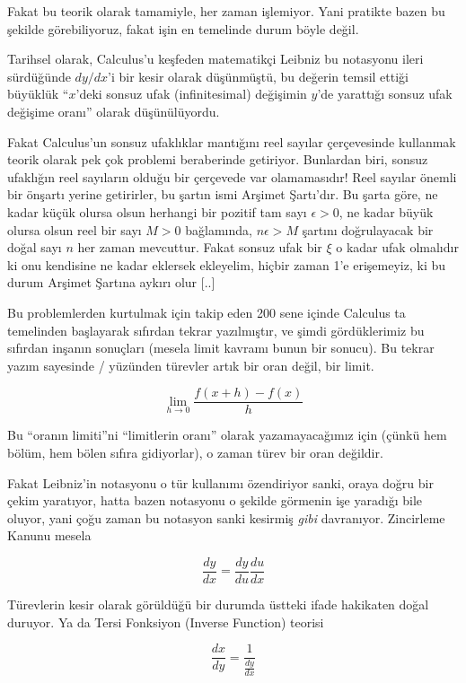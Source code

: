 \documentclass[12pt,fleqn]{article}\usepackage{../../common}
\begin{document}
Fakat bu teorik olarak tamamiyle, her zaman işlemiyor. Yani pratikte bazen
bu şekilde görebiliyoruz, fakat işin en temelinde durum böyle değil.

Tarihsel olarak, Calculus'u keşfeden matematikçi Leibniz bu notasyonu ileri
sürdüğünde $dy/dx$'i bir kesir olarak düşünmüştü, bu değerin temsil ettiği
büyüklük ``$x$'deki sonsuz ufak (infinitesimal) değişimin $y$'de yarattığı
sonsuz ufak değişime oranı'' olarak düşünülüyordu.

Fakat Calculus'un sonsuz ufaklıklar mantığını reel sayılar çerçevesinde
kullanmak teorik olarak pek çok problemi beraberinde getiriyor. Bunlardan
biri, sonsuz ufaklığın reel sayıların olduğu bir çerçevede var
olamamasıdır! Reel sayılar önemli bir önşartı yerine getirirler, bu şartın
ismi Arşimet Şartı'dır. Bu şarta göre, ne kadar küçük olursa olsun herhangi
bir pozitif tam sayı $\epsilon > 0$, ne kadar büyük olursa olsun reel bir
sayı $M>0$ bağlamında, $n\epsilon > M$ şartını doğrulayacak bir doğal sayı
$n$ her zaman mevcuttur. Fakat sonsuz ufak bir $\xi$ o kadar ufak olmalıdır
ki onu kendisine ne kadar eklersek ekleyelim, hiçbir zaman 1'e erişemeyiz,
ki bu durum Arşimet Şartına aykırı olur [..]

Bu problemlerden kurtulmak için takip eden 200 sene içinde Calculus ta
temelinden başlayarak sıfırdan tekrar yazılmıştır, ve şimdi gördüklerimiz
bu sıfırdan inşanın sonuçları (mesela limit kavramı bunun bir sonucu). Bu
tekrar yazım sayesinde / yüzünden türevler artık bir oran değil, bir limit.

$$ \lim_{h \to 0} \frac{f(x+h) - f(x)}{h}$$

Bu ``oranın limiti''ni ``limitlerin oranı'' olarak yazamayacağımız için
(çünkü hem bölüm, hem bölen sıfıra gidiyorlar), o zaman türev bir oran
değildir.

Fakat Leibniz'in notasyonu o tür kullanımı özendiriyor sanki, oraya doğru bir
çekim yaratıyor, hatta bazen notasyonu o şekilde görmenin işe yaradığı bile
oluyor, yani çoğu zaman bu notasyon sanki kesirmiş {\em gibi}
davranıyor. Zincirleme Kanunu mesela

$$ \frac{dy}{dx} = \frac{dy}{du}\frac{du}{dx} $$

Türevlerin kesir olarak görüldüğü bir durumda üstteki ifade hakikaten doğal
duruyor. Ya da Tersi Fonksiyon (Inverse Function) teorisi

$$ \frac{dx}{dy} = \frac{1}{\frac{dy}{dx}} $$
\end{document}
